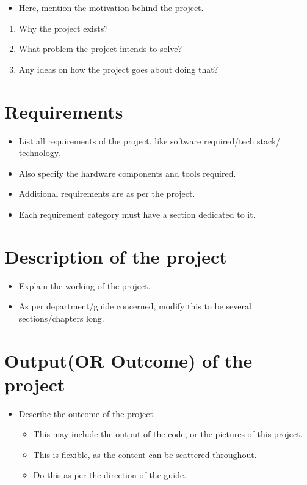 \documentclass[
  12pt,
  a4paper,
]{book}
\providecommand{\tightlist}{%
  \setlength{\itemsep}{0pt}\setlength{\parskip}{0pt}}
\begin{document}
\begin{itemize}
\tightlist
\item
  Here, mention the motivation behind the project.
\end{itemize}

\begin{enumerate}
\def\labelenumi{\arabic{enumi}.}
\tightlist
\item
  Why the project exists?
\item
  What problem the project intends to solve?
\item
  Any ideas on how the project goes about doing that?
\end{enumerate}

\chapter{Requirements}\label{sec:Requirements}

\begin{itemize}
\item
  List all requirements of the project, like software required/tech
  stack/ technology.
\item
  Also specify the hardware components and tools required.
\item
  Additional requirements are as per the project.
\item
  Each requirement category must have a section dedicated to it.
\end{itemize}

\chapter{Description of the project}\label{sec:Project}

\begin{itemize}
\tightlist
\item
  Explain the working of the project.
\item
  As per department/guide concerned, modify this to be several
  sections/chapters long.
\end{itemize}

\chapter{Output(OR Outcome) of the project}\label{sec:Conclusion}

\begin{itemize}
\tightlist
\item
  Describe the outcome of the project.

  \begin{itemize}
  \tightlist
  \item
    This may include the output of the code, or the pictures of this
    project.
  \item
    This is flexible, as the content can be scattered throughout.
  \item
    Do this as per the direction of the guide.
  \end{itemize}
\end{itemize}
\end{document}
